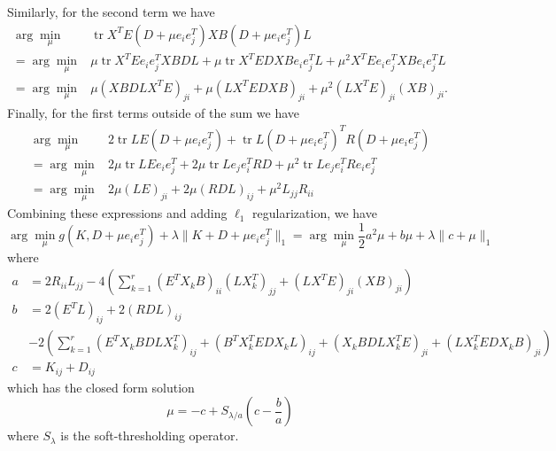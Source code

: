 \documentclass[12pt]{article}
\DeclareMathOperator*{\tr}{\mathrm{tr}}
\begin{document}
Similarly, for the second term we have
\begin{equation}
\begin{split}
\arg\min_\mu  &\tr X^TE(D +\mu e_ie_j^T) X B(D + \mu e_ie_j^T)L \\
= \arg\min_\mu & \mu \tr X^T E e_ie_j^TXBDL + \mu \tr X^TEDXBe_ie_j^TL + \mu^2
X^TEe_ie_j^TXBe_ie_j^TL \\
= \arg\min_\mu & \mu (XBDLX^TE)_{ji} + \mu (LX^TEDXB)_{ji} + \mu^2 (LX^TE)_{ji}(XB)_{ji}.
\end{split}
\end{equation}
Finally, for the first terms outside of the sum we have
\begin{equation}
\begin{split}
\arg\min_\mu  & 2 \tr LE(D + \mu e_ie_j^T) + \tr L(D + \mu e_ie_j^T)^TR(D + \mu e_ie_j^T)  \\
= \arg\min_\mu & 2 \mu \tr LEe_ie_j^T + 2 \mu \tr Le_je_i^TRD + \mu^2 \tr
Le_je_i^TRe_ie_j^T \\
= \arg\min_\mu & 2 \mu (LE)_{ji} + 2\mu (RDL)_{ij} + \mu^2 L_{jj}R_{ii}
\end{split}
\end{equation}
Combining these expressions and adding $\ell_1$ regularization, we have
\begin{equation}
\arg \min_\mu g(K, D + \mu e_ie_j^T) + \lambda\|K + D + \mu e_ie_j^T\|_1 = \arg
\min_\mu \frac{1}{2} a^2 \mu + b \mu + \lambda \|c + \mu \|_1
\end{equation}
where
\begin{equation}
\begin{split}
a &= 2 R_{ii}L_{jj} - 4 \left( \sum_{k=1}^r (E^TX_kB)_{ii}(LX_k^T)_{jj}
+ (LX^TE)_{ji}(XB)_{ji} \right) \\
b &= 2 (E^TL)_{ij} + 2(RDL)_{ij} \\
& - 2\left( \sum_{k=1}^r (E^TX_kBDLX_k^T)_{ij} +
(B^TX_k^TEDX_kL)_{ij} + (X_kBDLX_k^TE)_{ji} + (LX_k^TEDX_kB)_{ji} \right) \\
c &= K_{ij} + D_{ij}
\end{split}
\end{equation}
which has the closed form solution
\begin{equation}
\mu = -c + S_{\lambda/a}\left( c - \frac{b}{a} \right)
\end{equation}
where $S_\lambda$ is the soft-thresholding operator.
\end{document}
